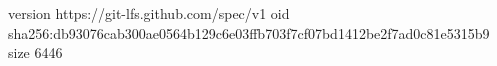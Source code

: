version https://git-lfs.github.com/spec/v1
oid sha256:db93076cab300ae0564b129c6e03ffb703f7cf07bd1412be2f7ad0c81e5315b9
size 6446
